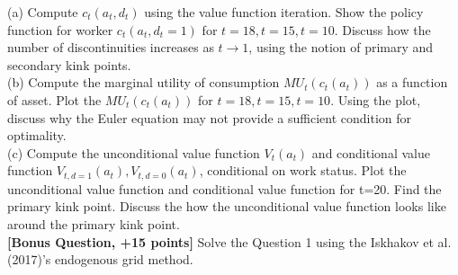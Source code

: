 \documentclass[paper=a4, fontsize=13pt]{extarticle} %
\numberwithin{equation}{section} %
\numberwithin{figure}{section} %
\numberwithin{table}{section} %
\begin{document}
(a) Compute $c_t(a_t,d_t)$ using the value function iteration. Show the policy function for worker $c_t(a_t,d_t=1)$ for $t=18, t=15, t=10$. Discuss how the number of discontinuities increases as $t \rightarrow 1$, using the notion of primary and secondary kink points.  \\

(b) Compute the marginal utility of consumption $MU_t(c_{t}(a_t))$ as a function of asset. Plot the $MU_t(c_{t}(a_t))$ for $t=18, t=15, t=10$. Using the plot, discuss why the Euler equation may not provide a sufficient condition for optimality. \\

(c) Compute the unconditional value function $V_t(a_t)$ and conditional value function $V_{t,d=1}(a_t), V_{t,d=0}(a_t)$, conditional on work status. Plot the unconditional value function and conditional value function for t=20. Find the primary kink point. Discuss the how the unconditional value function looks like around the primary kink point. \\




\textbf{[Bonus Question, +15 points]} \quad Solve the Question 1 using the Iskhakov et al. (2017)'s endogenous grid method. \\
\end{document}
